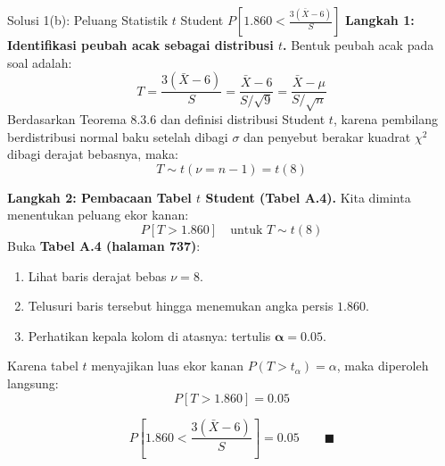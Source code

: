 \documentclass[10pt,twoside]{article}
\begin{document}
\begin{solbox}{Solusi 1(b): Peluang Statistik $t$ Student $P\left[1.860 < \frac{3(\bar{X}-6)}{S}\right]$}
\textbf{Langkah 1: Identifikasi peubah acak sebagai distribusi $t$.}
Bentuk peubah acak pada soal adalah:
\[
T = \frac{3(\bar{X} - 6)}{S} = \frac{\bar{X} - 6}{S/\sqrt{9}} = \frac{\bar{X} - \mu}{S/\sqrt{n}}
\]
Berdasarkan Teorema 8.3.6 dan definisi distribusi Student $t$, karena pembilang berdistribusi normal baku setelah dibagi $\sigma$ dan penyebut berakar kuadrat $\chi^2$ dibagi derajat bebasnya, maka:
\[
T \sim t(\nu = n - 1) = t(8)
\]

\textbf{Langkah 2: Pembacaan Tabel $t$ Student (Tabel A.4).}
Kita diminta menentukan peluang ekor kanan:
\[
P[T > 1.860] \quad \text{untuk } T \sim t(8)
\]
Buka \textbf{Tabel A.4 (halaman 737)}:
\begin{enumerate}
  \item Lihat baris derajat bebas $\nu = 8$.
  \item Telusuri baris tersebut hingga menemukan angka persis $\mathbf{1.860}$.
  \item Perhatikan kepala kolom di atasnya: tertulis $\mathbf{\alpha = 0.05}$.
\end{enumerate}
Karena tabel $t$ menyajikan luas ekor kanan $P(T > t_\alpha) = \alpha$, maka diperoleh langsung:
\[
P[T > 1.860] = 0.05
\]

\[
\boxed{P\left[1.860 < \frac{3(\bar{X} - 6)}{S}\right] = 0.05} \qquad \blacksquare
\]
\end{solbox}
\end{document}
